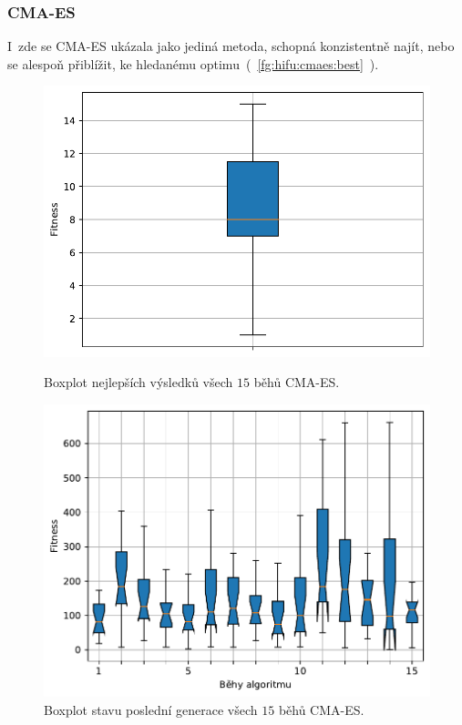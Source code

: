 \subsubsection{CMA-ES}
I~zde se CMA-ES ukázala jako jediná metoda, schopná konzistentně najít, nebo se alespoň přiblížit, ke hledanému optimu~(~\ref{fg:hifu:cmaes:best}~).

\begin{figure}[H]
    \begin{minipage}[t]{0.475\linewidth}
        \includegraphics[width=\linewidth]{obrazky-figures/statistics/HIFU/blob/20/CMAES/bestsBoxplot_WithOutliers.pdf}
        \caption{Boxplot nejlepších výsledků všech $15$ běhů CMA-ES.}
        \label{fg:hifu:blob:cmaes:best}
        \end{minipage}
        \hfill
        \begin{minipage}[t]{0.475\linewidth}
        \includegraphics[width=\linewidth]{obrazky-figures/statistics/HIFU/blob/20/CMAES/lastGenBoxplots.pdf}
        \caption{Boxplot stavu poslední generace všech $15$ běhů CMA-ES.}
        \label{fg:hifu:blob:cmaes:lastGen}
    \end{minipage}
\end{figure}


